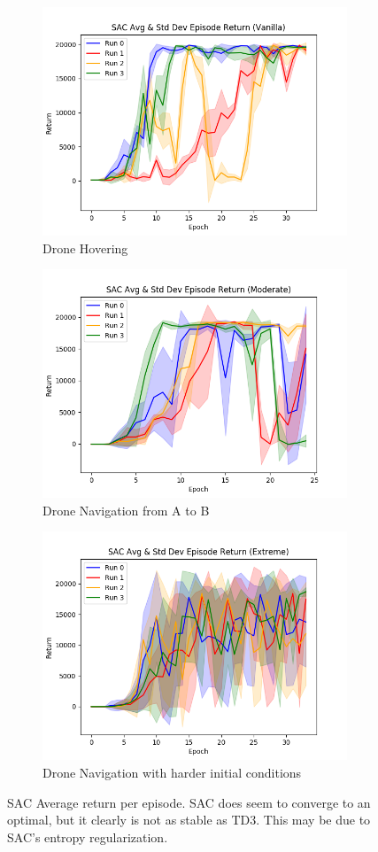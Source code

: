 \begin{figure}[H]
    \centering
     \begin{subfigure}[b]{\textwidth}
         \centering
             \includegraphics[width = .5\textwidth]{img/SAC_return_vanilla.png}
             \caption{Drone Hovering}
     \end{subfigure}
    \hfill 
     \begin{subfigure}[b]{\textwidth}
         \centering
             \includegraphics[width = .5\textwidth]{img/SAC_return_moderate.png}
             \caption{Drone Navigation from A to B}
     \end{subfigure}
     \hfill
     \begin{subfigure}[b]{\textwidth}
         \centering
             \includegraphics[width = .5\textwidth]{img/SAC_return_extreme.png}
             \caption{Drone Navigation with harder initial conditions}
     \end{subfigure}
    \caption{SAC Average return per episode. SAC does seem to converge to an optimal, but it clearly is not as stable as TD3. This may be due to SAC's entropy regularization.}
    \label{fig:sac}
\end{figure}

